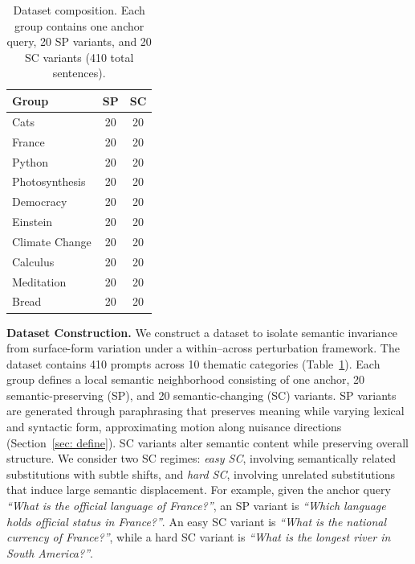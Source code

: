 


\begin{table}
\vspace{-0.9em}
\centering
\footnotesize
\setlength{\tabcolsep}{4pt}
\renewcommand{\arraystretch}{1.1}
\begin{tabular}{lcc}
\toprule
\textbf{Group} & \textbf{SP} & \textbf{SC} \\
\midrule
Cats           & 20 & 20 \\
France         & 20 & 20 \\
Python         & 20 & 20 \\
Photosynthesis & 20 & 20 \\
Democracy      & 20 & 20 \\
Einstein       & 20 & 20 \\
Climate Change & 20 & 20 \\
Calculus       & 20 & 20 \\
Meditation     & 20 & 20 \\
Bread          & 20 & 20 \\
\bottomrule
\end{tabular}
\caption{Dataset composition. Each group contains one anchor query, 20 SP variants, and 20 SC variants (410 total sentences).}
\label{tab:dataset_category}
\vspace{-1.2em}
\end{table}

\textbf{Dataset Construction.}
We construct a dataset to isolate semantic invariance from surface-form variation under a within--across perturbation framework. The dataset contains 410 prompts across 10 thematic categories (Table~\ref{tab:dataset_category}). Each group defines a local semantic neighborhood consisting of one anchor, 20 semantic-preserving (SP), and 20 semantic-changing (SC) variants. 
SP variants are generated through paraphrasing that preserves meaning while varying lexical and syntactic form, approximating motion along nuisance directions (Section~\ref{sec: define}). SC variants alter semantic content while preserving overall structure. We consider two SC regimes: \emph{easy SC}, involving semantically related substitutions with subtle shifts, and \emph{hard SC}, involving unrelated substitutions that induce large semantic displacement. For example, given the anchor query \emph{``What is the official language of France?''}, an SP variant is \emph{``Which language holds official status in France?''}. An easy SC variant is \emph{``What is the national currency of France?''}, while a hard SC variant is \emph{``What is the longest river in South America?''}.



